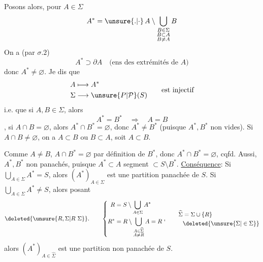 Posons alors, pour $A\in\Sigma$
\[
 A^*=\unsure{.|\cdot}\, A\setminus\bigcup_{\substack{B\in\Sigma\\ B\subset A\\ B\ne A}} B
\]
On a (par $\sigma.2$)
\[
 A^*\supset\partial A\quad\text{(ens des extrémités de $A$)}
\]
donc $A^*\ne\varnothing$. Je dis que
\[
 \begin{aligned}
 A&\longmapsto A^*\\
 \Sigma&\longrightarrow \unsure{P|\mathcal P}(S)
 \end{aligned}
 \qquad\text{est injectif}
\]
i.e. que si $A,B\in\Sigma$, alors
\[
 A^*=B^*\quad\Longrightarrow\quad A=B
\]
 , si $A\cap B=\varnothing$, alors $A^*\cap B^*=\varnothing$, donc $A^*\ne B^*$ (puisque $A^*,B^*$ non vides). Si $A\cap B\ne\varnothing$, on a  $A\subset B$ ou $B\subset A$, soit $A\subset B$.

 Comme $A\ne B$, $A\cap B^*=\varnothing$ par définition de $B^*$, donc $A^*\cap B^*=\varnothing$, cqfd.  Aussi, $A^*,B^*$ non panachés, puisque $A^*\subset A$ segment $\subset S\setminus B^*$.
\uline{Conséquence}: Si $\bigcup_{A\in\Sigma}A^*=S$, alors  $(A^*)_{A\in\Sigma}$ est une partition   panachée de $S$. Si $\bigcup_{A\in\Sigma} A^*\ne S$, alors posant
\[
 \deleted{\unsure{R,\Sigma|R\ \Sigma}}\mathpunct{.}\qquad
 \left\{\begin{aligned}
 R&=S\setminus\bigcup_{A\in\Sigma}A^*\\
 R^*&=R\setminus\bigcup_{\substack{A\in\widehat\Sigma\\ A\ne R}}A=R
 \end{aligned}\right.,\qquad
 \begin{aligned}
 \widehat\Sigma&=\Sigma\cup\{R\}\\
 &\deleted{\unsure{\Sigma|\in\Sigma}}
 \end{aligned}
\]
alors $(A^*)_{A\in\widehat\Sigma}$ est une partition non panachée de $S$.

